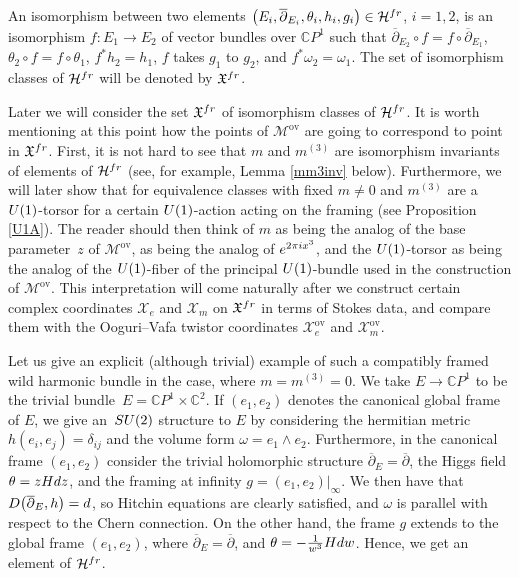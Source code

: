 \documentclass[11pt]{article}
\numberwithin{equation}{section}
\numberwithin{equation}{section}
\newcommand{\CP}{\mathbb{C}P^1}
\begin{document}
\begin{Definition} An isomorphism between two elements $\bigl(E_i,\overline{\partial}_{E_i},\theta_i,h_i,g_i\bigr)\in \mathcal{H}^{{\rm fr}}$, $i=1,2$, is an isomorphism $f\colon E_1\to E_2$ of vector bundles over $\mathbb{C}P^1$ such that $\overline{\partial}_{E_2}\circ f=f\circ \overline{\partial}_{E_1}$, $\theta_2\circ f=f\circ \theta_1$, $f^*h_2=h_1$, $f$ takes $g_1$ to $g_2$, and $f^*\omega_{2}=\omega_{1}$. The set of isomorphism classes of $\mathcal{H}^{{\rm fr}}$ will be denoted by $\mathfrak{X}^{{\rm fr}}$.
\end{Definition}
\begin{Remark}
Later we will consider the set $\mathfrak{X}^{{\rm fr}}$ of isomorphism classes of $\mathcal{H}^{{\rm fr}}$. It is worth mentioning at this point how the points of $\mathcal{M}^{\text{ov}}$ are going to correspond to point in $\mathfrak{X}^{{\rm fr}}$. First, it is not hard to see that $m$ and $m^{(3)}$ are isomorphism invariants of elements of $\mathcal{H}^{{\rm fr}}$ (see, for example, Lemma \ref{mm3inv} below). Furthermore, we will later show that for equivalence classes with fixed $m\neq 0$ and $m^{(3)}$ are a ${\rm U}(1)$-torsor for a certain ${\rm U}(1)$-action acting on the framing (see Proposition \ref{U1A}). The reader should then think of $m$ as being the analog of the base parameter~$z$ of $\mathcal{M}^{\text{ov}}$,  as being the analog of ${\rm e}^{2\pi {\rm i}x^3}$, and the ${\rm U}(1)$-torsor as being the analog of the ${\rm U}(1)$-fiber of the principal ${\rm U}(1)$-bundle used in the construction of $\mathcal{M}^{\text{ov}}$. This interpretation will come naturally after we construct certain complex coordinates $\mathcal{X}_e$ and $\mathcal{X}_m$ on $\mathfrak{X}^{{\rm fr}}$ in terms of Stokes data, and compare them with the Ooguri--Vafa twistor coordinates $\mathcal{X}_e^{\text{ov}}$ and $\mathcal{X}_m^{\text{ov}}$.
\end{Remark}

\begin{Example}\label{trivWHB} Let us give an explicit (although trivial) example of such a compatibly framed wild harmonic bundle in the case, where $m=m^{(3)}=0$. We take $E\to \CP$ to be the trivial bundle~${E=\CP \times \mathbb{C}^2}$. If $(e_1,e_2)$ denotes the canonical global frame of $E$, we give an~${\rm SU}(2)$ structure to $E$ by considering the hermitian metric $h(e_i,e_j)=\delta_{ij}$ and the volume form ${\omega=e_1\wedge e_2}$. Furthermore, in the canonical frame $(e_1,e_2)$ consider the trivial holomorphic structure $\overline{\partial}_E=\overline{\partial}$, the Higgs field $\theta=zH{\rm d}z$, and the framing at infinity $g=(e_1,e_2)|_{\infty}$. We then have that~$D\bigl(\overline{\partial}_E,h\bigr)={\rm d}$, so Hitchin equations are clearly satisfied, and $\omega$ is parallel with respect to the Chern connection. On the other hand,
the frame $g$ extends to the global frame $(e_1,e_2)$, where $\overline{\partial}_E=\overline{\partial}$, and $\theta=-\frac{1}{w^3}H{\rm d}w$. Hence, we get an element of $\mathcal{H}^{{\rm fr}}$.
\end{Example}
\end{document}
